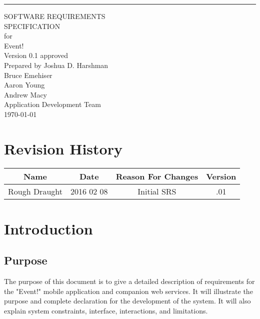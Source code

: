 \documentclass{scrreprt}
\date{}
\def\myversion{0.1 }
\begin{document}
\begin{flushright}
    \rule{16cm}{5pt}\vskip1cm
    \begin{bfseries}
        \Huge{SOFTWARE REQUIREMENTS\\ SPECIFICATION}\\
        \vspace{1.9cm}
        for\\
        \vspace{1.9cm}
        Event!\\
        \vspace{1.9cm}
        \LARGE{Version \myversion approved}\\
        \vspace{1.9cm}
        Prepared by Joshua D. Harshman\\Bruce Emehiser\\Aaron Young\\Andrew Macy\\
        \vspace{1.9cm}
        Application Development Team\\
        \vspace{1.9cm}
        \today\\
    \end{bfseries}
\end{flushright}

\tableofcontents


\chapter*{Revision History}

\begin{center}
    \begin{tabular}{|c|c|c|c|}
        \hline
	    Name & Date & Reason For Changes & Version\\
        \hline
	    Rough Draught & 2016 02 08 & Initial SRS & .01\\
        \hline
    \end{tabular}
\end{center}

\chapter{Introduction}

\section{Purpose}
The purpose of this document is to give a detailed description of requirements for
the "Event!" mobile application and companion web services. It will illustrate the purpose
and complete declaration for the development of the system.  It will also explain system
constraints, interface, interactions, and limitations. 
\end{document}
